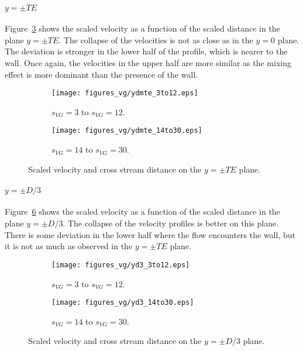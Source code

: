 \paragraph*{$y = \pm TE$}
Figure~\ref{fig:scaledveldte} shows the scaled velocity as a function of the scaled distance in the plane $y=\pm TE$. The collapse of the velocities is not as close as in the $y=0$ plane. The deviation is stronger in the lower half of the profile, which is nearer to the wall. Once again, the velocities in the upper half are more similar as the mixing effect is more dominant than the presence of the wall.
\begin{figure}[h!]
\centering
\captionsetup{justification=centering}
\begin{subfigure}[b]{0.45\textwidth}
   \texttt{[image: figures\_vg/ydmte\_3to12.eps]}
   \caption{$s_{VG} = 3$ to $s_{VG}=12$.}
   \captionsetup{justification=centering}
   \label{fig:scaleydte1}
\end{subfigure}
\begin{subfigure}[b]{0.45\textwidth}
   \centering
   \captionsetup{justification=centering}
   \texttt{[image: figures\_vg/ydmte\_14to30.eps]}
   \caption{$s_{VG} = 14$ to $s_{VG}=30$.}
   \label{fig:scaleydte2}
\end{subfigure}
\caption{Scaled velocity and cross stream distance on the $y=\pm TE$ plane.}
\label{fig:scaledveldte}
\end{figure}

\paragraph*{$y = \pm D/3$}
Figure~\ref{fig:scaledveld3} shows the scaled velocity as a function of the scaled distance in the plane $y=\pm D/3$. The collapse of the velocity profiles is better on this plane. There is some deviation in the lower half where the flow encounters the wall, but it is not as much as observed in the $y=\pm TE$ plane.
\begin{figure}[h!]
\centering
\captionsetup{justification=centering}
\begin{subfigure}[b]{0.45\textwidth}
   \centering    
   \captionsetup{justification=centering}
   \texttt{[image: figures\_vg/yd3\_3to12.eps]}
   \caption{$s_{VG} = 3$ to $s_{VG}=12$.}
   \label{fig:scaleyd31}
\end{subfigure}
\begin{subfigure}[b]{0.45\textwidth}
   \centering
   \captionsetup{justification=centering}
   \texttt{[image: figures\_vg/yd3\_14to30.eps]}
   \caption{$s_{VG} = 14$ to $s_{VG}=30$.}
   \label{fig:scaleyd32}
\end{subfigure}
\caption{Scaled velocity and cross stream distance on the $y=\pm D/3$ plane.}
\label{fig:scaledveld3}
\end{figure}

